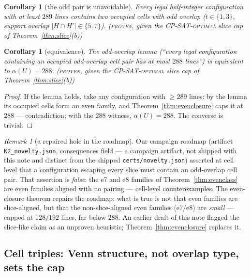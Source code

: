 \documentclass[11pt]{article}
\newtheorem{corollary}[theorem]{Corollary}
\theoremstyle{remark}
\newtheorem{remark}[theorem]{Remark}
\begin{document}
\begin{corollary}[the odd pair is unavoidable]\label{cor:oddpair}
Every legal half-integer configuration with at least $289$ lines contains
two occupied cells with odd overlap ($t\in\{1,3\}$, support overlap
$|H\cap H'|\in\{5,7\}$). \textsc{(proven}, given the CP-SAT-\textsc{optimal}
slice cap of Theorem~\ref{thm:slice}(b)\textsc{)}
\end{corollary}

\begin{corollary}[equivalence]\label{cor:equiv}
The odd-overlap lemma (``every legal configuration containing an occupied
odd-overlap cell pair has at most $288$ lines'') is \emph{equivalent} to
$\alpha(U)=288$. \textsc{(proven}, given the CP-SAT-\textsc{optimal}
slice cap of Theorem~\ref{thm:slice}(b)\textsc{)}
\end{corollary}

\begin{proof}
If the lemma holds, take any configuration with $\ge289$ lines: by the
lemma its occupied cells form an even family, and
Theorem~\ref{thm:evenclosure} caps it at $288$ --- contradiction; with the
$288$ witness, $\alpha(U)=288$. The converse is trivial.
\end{proof}

\begin{remark}[a repaired hole in the roadmap]\label{rem:roadmap}
Our campaign roadmap (artifact \texttt{K2\_novelty.json}, consequences
field --- a campaign artifact, not shipped with this note and distinct
from the shipped \texttt{certs/novelty.json}) asserted at cell level that a configuration escaping every slice
must contain an odd-overlap cell pair. That assertion is \emph{false}: the
e7 and e8 families of Theorem~\ref{thm:evenclass} are even families
aligned with no pairing --- cell-level counterexamples. The even-closure
theorem repairs the roadmap: what is true is not that even families are
slice-aligned, but that the non-slice-aligned even families (e7/e8) are
\emph{small} --- capped at $128/192$ lines, far below $288$. An earlier
draft of this note flagged the slice-like claim as an unproven heuristic;
Theorem~\ref{thm:evenclosure} replaces it.
\end{remark}

\subsection{Cell triples: Venn structure, not overlap type, sets the
cap}\label{sec:triples}
\end{document}

